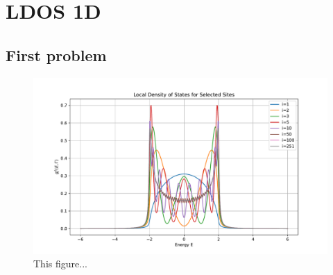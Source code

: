 \section{LDOS 1D}

\subsection{First problem}

\begin{figure}[H]
    \centering    \includegraphics[width=\textwidth]{Figures/task1.pdf}
    \caption{This figure...}
    \label{fig:task1}
\end{figure}